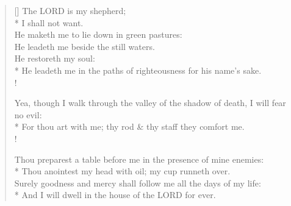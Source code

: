 \documentclass[MAIN]{subfiles}
\begin{document}
\settowidth{\versewidth}{He leadeth me in the paths of righteousness for his name's sake.}
\begin{verse}[\versewidth]
The {\hge LORD} is my shepherd;\\*
\vin I shall not want.\\
He maketh me to lie down in green pastures:\\
\vin He leadeth me beside the still waters.\\
He restoreth my soul:\\*
\vin He leadeth me in the paths of righteousness for his name's sake.\\!

Yea, though I walk through the valley of the shadow of death, I will fear no evil:\\*
\vin For thou art with me; thy rod \& thy staff they comfort me.\\!

Thou preparest a table before me in the presence of mine enemies:\\*
\vin Thou anointest my head with oil; my cup runneth over.\\
Surely goodness and mercy shall follow me all the days of my life:\\*
\vin And I will dwell in the house of the {\hge LORD} for ever.
\end{verse}
\end{document}
